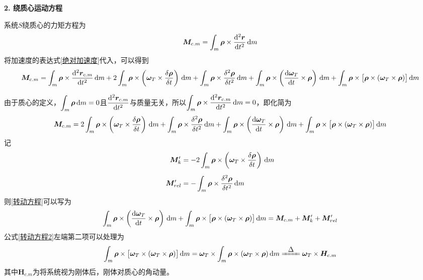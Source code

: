 \textbf{2. 绕质心运动方程}

系统$S$绕质心的力矩方程为
\begin{equation}
	\bm{M}_{c.m} = \int_m \bm{\rho} \times \dfrac{{\rm{d}}^2 \bm{r}}{{\rm{d}} t^2} \, {\rm{d}} m
\end{equation}
将加速度的表达式\eqref{绝对加速度}代入，可以得到
\begin{align*}
	\bm{M}_{c.m} = \int_m \bm{\rho} \times \dfrac{{\rm{d}}^2 \bm{r}_{c.m}}{{\rm{d}} t^2}\, {\rm{d}} m 
	+ 2 \int_m \bm{\rho} \times \left(\bm{\omega}_T \times \dfrac{\delta \bm{\rho}}{\delta t}\right)\, {\rm{d}} m 
	+ \int_m \bm{\rho} \times \dfrac{\delta^2 \bm{\rho}}{\delta t^2}\, {\rm{d}} m 
	+ \int_m \bm{\rho}\times \left(\dfrac{{\rm{d}} \bm{\omega}_T}{{\rm{d}} t} \times \bm{\rho}\right)\, {\rm{d}} m 
	+ \int_m \bm{\rho}\times \big[\bm{\rho} \times (\bm{\omega}_T \times \bm{\rho})\big]\, {\rm{d}} m
\end{align*}

由于质心的定义，$\displaystyle \int_m \bm{\rho} \, {\rm{d}} m = 0$且$\dfrac{{\rm{d}}^2 \bm{r}_{c.m}}{{\rm{d}} t^2}$与质量无关，所以$\displaystyle \int_m \bm{\rho} \times \dfrac{{\rm{d}}^2 \bm{r}_{c.m}}{{\rm{d}} t^2}\, {\rm{d}} m = 0$，即化简为
\begin{align}
	\bm{M}_{c.m} = 2 \int_m \bm{\rho} \times \left(\bm{\omega}_T \times \dfrac{\delta \bm{\rho}}{\delta t}\right)\, {\rm{d}} m 
	+ \int_m \bm{\rho} \times \dfrac{\delta^2 \bm{\rho}}{\delta t^2}\, {\rm{d}} m 
	+ \int_m \bm{\rho}\times \left(\dfrac{{\rm{d}} \bm{\omega}_T}{{\rm{d}} t} \times \bm{\rho}\right)\, {\rm{d}} m 
	+ \int_m \bm{\rho}\times \big[\bm{\rho} \times (\bm{\omega}_T \times \bm{\rho})\big]\, {\rm{d}} m
	\label{转动方程}
\end{align}
记
\begin{align*}
	\bm{M}'_k &= - 2 \int_m \bm{\rho} \times \left(\bm{\omega}_T \times \dfrac{\delta \bm{\rho}}{\delta t}\right)\, {\rm{d}} m \\[0.5em]
	\bm{M}'_{rel} &= - \int_m \bm{\rho} \times \dfrac{\delta^2 \bm{\rho}}{\delta t^2}\, {\rm{d}} m
\end{align*}
则\eqref{转动方程}可以写为
\begin{equation}
	\int_m \bm{\rho}\times \left(\dfrac{{\rm{d}} \bm{\omega}_T}{{\rm{d}} t} \times \bm{\rho}\right)\, {\rm{d}} m 
	+ \int_m \bm{\rho}\times \big[\bm{\rho} \times (\bm{\omega}_T \times \bm{\rho})\big]\, {\rm{d}} m 
	= \bm{M}_{c.m} + \bm{M}'_k + \bm{M}'_{rel}
	\label{转动方程2}
\end{equation}
公式\eqref{转动方程2}左端第二项可以处理为
\begin{equation}
	\int_m \bm{\rho} \times \big[\bm{\omega}_T \times (\bm{\omega}_T \times \bm{\rho})\big]\, \d m = \bm{\omega}_T \times \int_m \bm{\rho} \times (\bm{\omega}_T \times \bm{\rho}) \, \d m \xlongequal[]{ \textstyle \hspace*{0.5em} \Delta \hspace*{0.5em}} \bm{\omega}_T \times \bm{H}_{c.m}
\end{equation}
其中$\bm{H}_{c.m}$为将系统视为刚体后，刚体对质心的角动量。


